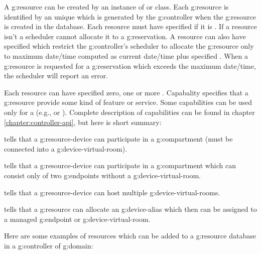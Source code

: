 A \gls{g:resource} can be created by an instance of  or  class. Each \gls{g:resource} is identified by an unique  which is generated by the \gls{g:controller} when the \gls{g:resource} is created in the database. Each resource must have specified if it is . If a resource isn't  a scheduler cannot allocate it to a \gls{g:reservation}. A resource can also have specified  which restrict the \gls{g:controller}'s scheduler to allocate the \gls{g:resource} only to maximum date/time computed as current date/time plus specified . When a \gls{g:resource} is requested for a \gls{g:reservation} which exceeds the maximum date/time, the scheduler will report an error.

Each resource can have specified zero, one or more . Capabality specifies that a \gls{g:resource} provide some kind of feature or service. Some capabilities can be used only for a  (e.g.,  or ). Complete description of capabilities can be found in chapter \ref{chapter:controller-api}, but here is short summary:
\begin{compactitem}
\item {} tells that a \gls{g:resource-device} can participate in a \gls{g:compartment} (must be connected into a \gls{g:device-virtual-room}).
\item {} tells that a \gls{g:resource-device} can participate in a \gls{g:compartment} which can consist only of two \glspl{g:endpoint} without a \gls{g:device-virtual-room}.
\item {} tells that a \gls{g:resource-device} can host multiple \glspl{g:device-virtual-room}.
\item {} tells that a \gls{g:resource} can allocate an \gls{g:device-alias} which then can be assigned to a managed \gls{g:endpoint} or \gls{g:device-virtual-room}.
\end{compactitem}

Here are some examples of resources which can be added to a \gls{g:resource} database in a \gls{g:controller} of  \gls{g:domain}:

